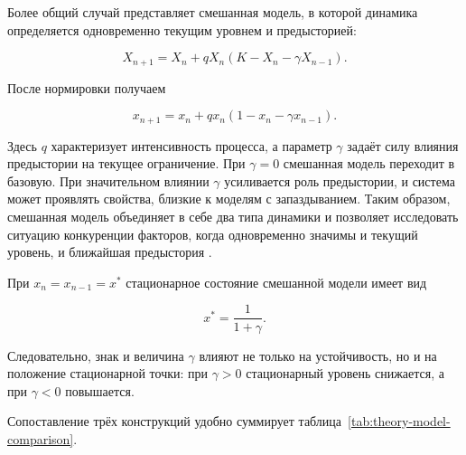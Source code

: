 Более общий случай представляет смешанная модель, в которой динамика определяется одновременно текущим уровнем и предысторией:

\begin{equation}
X_{n+1}=X_n + q X_n (K-X_n-\gamma X_{n-1}).
\label{eq:mixed-model}
\end{equation}

После нормировки получаем

\begin{equation}
x_{n+1}=x_n + q x_n (1-x_n-\gamma x_{n-1}).
\label{eq:mixed-model-normalized}
\end{equation}

Здесь \(q\) характеризует интенсивность процесса, а параметр \(\gamma\) задаёт силу влияния предыстории на текущее ограничение. При \(\gamma=0\) смешанная модель переходит в базовую. При значительном влиянии \(\gamma\) усиливается роль предыстории, и система может проявлять свойства, близкие к моделям с запаздыванием. Таким образом, смешанная модель объединяет в себе два типа динамики и позволяет исследовать ситуацию конкуренции факторов, когда одновременно значимы и текущий уровень, и ближайшая предыстория \cite{polunin-2019,pu}.

При \(x_n=x_{n-1}=x^*\) стационарное состояние смешанной модели имеет вид

\begin{equation}
x^*=\frac{1}{1+\gamma}.
\label{eq:mixed-stationary}
\end{equation}

Следовательно, знак и величина \(\gamma\) влияют не только на устойчивость, но и на положение стационарной точки: при \(\gamma>0\) стационарный уровень снижается, а при \(\gamma<0\) повышается.

Сопоставление трёх конструкций удобно суммирует таблица~\ref{tab:theory-model-comparison}.

\begin{center}
\label{tab:theory-model-comparison}
\end{center}

